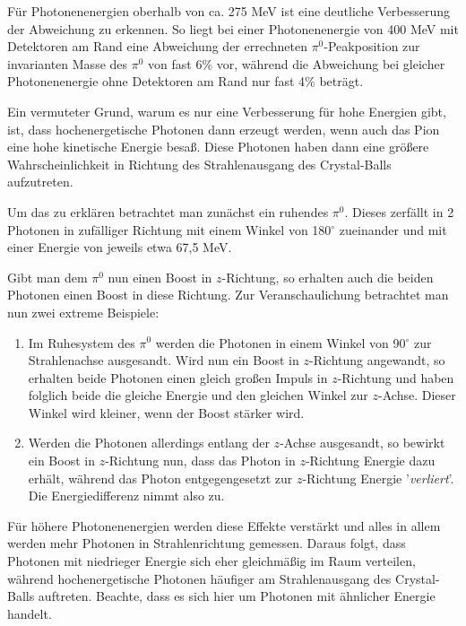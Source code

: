 \documentclass[a4paper,11pt,oneside,final,german,openbib,pdftex]{scrbook}
\begin{document}
{F\"ur Photonenenergien oberhalb von ca. 275 MeV ist eine deutliche Verbesserung der Abweichung zu erkennen. So liegt bei einer Photonenenergie von 400 MeV mit Detektoren am Rand eine Abweichung der errechneten $\pi^0$-Peakposition zur invarianten Masse des $\pi^0$ von fast 6\% vor, w\"ahrend die Abweichung bei gleicher Photonenenergie ohne Detektoren am Rand nur fast 4\% betr\"agt.

Ein vermuteter Grund, warum es nur eine Verbesserung für hohe Energien gibt, ist, dass hochenergetische Photonen dann erzeugt werden, wenn auch das Pion eine hohe kinetische Energie besa{\ss}. Diese Photonen haben dann eine gr\"o{\ss}ere Wahrscheinlichkeit in Richtung des Strahlenausgang des Crystal-Balls aufzutreten.

Um das zu erkl\"aren betrachtet man zun\"achst ein ruhendes $\pi^0$. Dieses zerf\"allt in 2 Photonen in zuf\"alliger Richtung mit einem Winkel von 180$^{\circ}$ zueinander und mit einer Energie von jeweils etwa 67,5 MeV. 

Gibt man dem $\pi^0$ nun einen Boost in $z$-Richtung, so erhalten auch die beiden Photonen einen Boost in diese Richtung.
Zur Veranschaulichung betrachtet man nun zwei extreme Beispiele:

\begin{enumerate}
	\item Im Ruhesystem des $\pi^0$ werden die Photonen in einem Winkel von 90$^{\circ}$ zur Strahlenachse ausgesandt. Wird nun ein Boost in $z$-Richtung angewandt, so erhalten beide Photonen einen gleich gro{\ss}en Impuls in $z$-Richtung und haben folglich beide die gleiche Energie und den gleichen Winkel zur $z$-Achse. Dieser Winkel wird kleiner, wenn der Boost st\"arker wird.
	\item Werden die Photonen allerdings entlang der $z$-Achse ausgesandt, so bewirkt ein Boost in $z$-Richtung nun, dass das Photon in $z$-Richtung Energie dazu erh\"alt, w\"ahrend das Photon entgegengesetzt zur $z$-Richtung Energie '\textit{verliert}'. Die Energiedifferenz nimmt also zu.
\end{enumerate}

F\"ur h\"ohere Photonenenergien werden diese Effekte verst\"arkt und alles in allem werden mehr Photonen in Strahlenrichtung gemessen. Daraus folgt, dass Photonen mit niedrieger Energie sich eher gleichm\"a{\ss}ig im Raum verteilen, w\"ahrend hochenergetische Photonen h\"aufiger am Strahlenausgang des Crystal-Balls auftreten. Beachte, dass es sich hier um Photonen mit \"ahnlicher Energie handelt.

}
\end{document}
